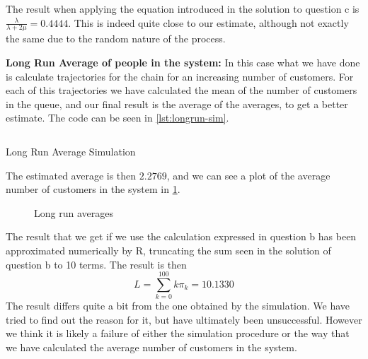 \documentclass[11pt, a4paper]{article}
\begin{document}
The result when applying the equation introduced in the solution to question c is $\frac{\lambda}{\lambda + 2\mu} = 0.4444$. This is indeed quite close to our estimate, although not exactly the same due to the random nature of the process.

\textbf{Long Run Average of people in the system:}
In this case what we have done is calculate trajectories for the chain for an increasing number of customers. For each of this trajectories we have calculated the mean of the number of customers in the queue, and our final result is the average of the averages, to get a better estimate. The code can be seen in \cref{lst:longrun-sim}.
\begin{listing}[H]
	\inputminted[firstline = 203, lastline = 210]{R}{../main.R}
	\caption{Long Run Average Simulation}
	\label{lst:longrun-sim}
\end{listing}
The estimated average is then $2.2769$, and we can see a plot of the average number of customers in the system in \cref{fig:lravg}.
\begin{figure}[H]
	\centering
	
	\caption{Long run averages}
	\label{fig:lravg}
\end{figure}

The result that we get if we use the calculation expressed in question b has been approximated numerically by R, truncating the sum seen in the solution of question b to 10 terms. The result is then
\[
	L = \sum_{k = 0}^{100} k \pi_k = 10.1330
\]
The result differs quite a bit from the one obtained by the simulation. We have tried to find out the reason for it, but have ultimately been unsuccessful. 
However we think it is likely a failure of either the simulation procedure or the way that we have calculated the average number of customers in the system. 

\printbibliography
\end{document}
